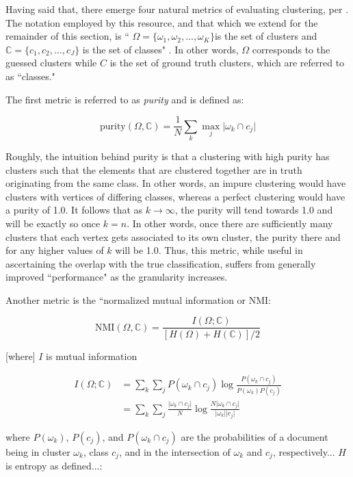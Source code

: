 \documentclass[journal]{IEEEtran}
\begin{document}
Having said that, there emerge four natural metrics of evaluating clustering, per \cite{evaluation}. The notation employed by this resource, and that which we extend for the remainder of this section, is `` $\Omega = \{ \omega_1, \omega_2, \ldots, \omega_K \}$is the set of clusters and $\mathbb{C} = \{ c_1,c_2,\ldots,c_J \}$  is the set of classes" \cite{evaluation}. In other words, $\Omega$ corresponds to the guessed clusters while $C$ is the set of ground truth clusters, which are referred to as ``classes." 

The first metric is referred to as \textit{purity} and is defined as:

$$ \text{purity}( \Omega,\mathbb{C} ) = \frac{1}{N} \sum_k \max_j \vert\omega_k \cap c_j\vert $$

Roughly, the intuition behind purity is that a clustering with high purity has clusters such that the elements that are clustered together are in truth originating from the same class. In other words, an impure clustering would have clusters with vertices of differing classes, whereas a perfect clustering would have a purity of 1.0. It follows that as $k\rightarrow\infty$, the purity will tend towards 1.0 and will be exactly so once $k=n$. In other words, once there are sufficiently many clusters that each vertex gets associated to its own cluster, the purity there and for any higher values of $k$ will be 1.0. Thus, this metric, while useful in ascertaining the overlap with the true classification, suffers from generally improved ``performance" as the granularity increases. 

Another metric is the ``normalized mutual information or NMI:

$$ \text{NMI}(\Omega , \mathbb{C}) = \frac{ I(\Omega ; \mathbb{C}) } { [H(\Omega)+ H(\mathbb{C} )]/2 } $$

[where] $I$ is mutual information

\begin{align}
I( \Omega ; \mathbb{C} ) &= \sum_k \sum_j P(\omega_k \cap c_j) \log \frac{P(\omega_k \cap c_j)}{P(\omega_k)P(c_j)} \\
&= \sum_k \sum_j \frac{\vert\omega_k \cap c_j\vert}{N} \log \frac{N\vert\omega_k \cap c_j\vert}{\vert\omega_k\vert\vert c_j\vert}
\end{align}

where $P(\omega_k)$, $P(c_j)$, and $P(\omega_k \cap c_j)$ are the probabilities of a document being in cluster $\omega_k$, class $c_j$, and in the intersection of $\omega_k$ and $c_j$, respectively... $H$ is entropy as defined...:
\end{document}
